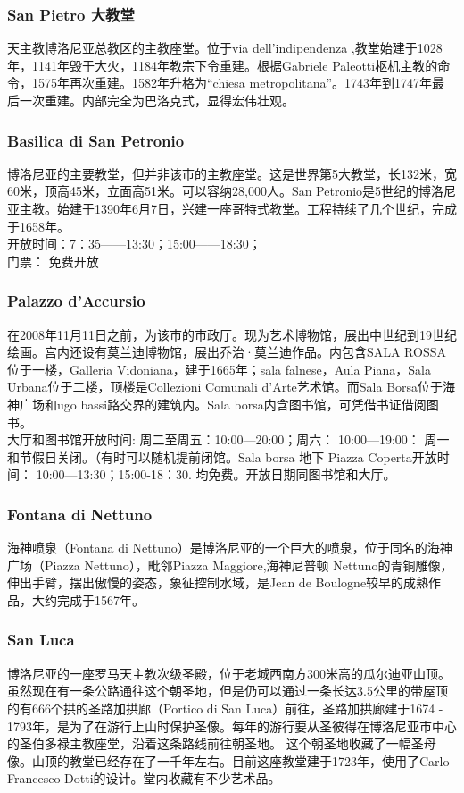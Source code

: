 \subsubsection{San Pietro 大教堂}
天主教博洛尼亚总教区的主教座堂。位于via dell'indipendenza ,教堂始建于1028年，1141年毁于大火，1184年教宗下令重建。根据Gabriele Paleotti枢机主教的命令，1575年再次重建。1582年升格为“chiesa metropolitana”。1743年到1747年最后一次重建。内部完全为巴洛克式，显得宏伟壮观。

\subsubsection{Basilica di San Petronio}
博洛尼亚的主要教堂，但并非该市的主教座堂。这是世界第5大教堂，长132米，宽60米，顶高45米，立面高51米。可以容纳28,000人。San Petronio是5世纪的博洛尼亚主教。始建于1390年6月7日，兴建一座哥特式教堂。工程持续了几个世纪，完成于1658年。\\
开放时间：7：35——13:30；15:00——18:30；\\
门票： 免费开放

\subsubsection{Palazzo d'Accursio}
在2008年11月11日之前，为该市的市政厅。现为艺术博物馆，展出中世纪到19世纪绘画。宫内还设有莫兰迪博物馆，展出乔治·莫兰迪作品。内包含SALA ROSSA位于一楼，Galleria Vidoniana，建于1665年；sala falnese，Aula Piana，Sala Urbana位于二楼，顶楼是Collezioni Comunali d'Arte艺术馆。而Sala Borsa位于海神广场和ugo bassi路交界的建筑内。Sala borsa内含图书馆，可凭借书证借阅图书。\\
大厅和图书馆开放时间: 周二至周五：10:00—20:00；周六： 10:00—19:00：   周一和节假日关闭。（有时可以随机提前闭馆。Sala borsa 地下 Piazza Coperta开放时间： 10:00—13:30；15:00-18：30. 均免费。开放日期同图书馆和大厅。

\subsubsection{Fontana di Nettuno}
海神喷泉（Fontana di Nettuno）是博洛尼亚的一个巨大的喷泉，位于同名的海神广场（Piazza Nettuno），毗邻Piazza Maggiore,海神尼普顿 Nettuno的青铜雕像，伸出手臂，摆出傲慢的姿态，象征控制水域，是Jean de Boulogne较早的成熟作品，大约完成于1567年。



\subsubsection{San Luca}
博洛尼亚的一座罗马天主教次级圣殿，位于老城西南方300米高的瓜尔迪亚山顶。
虽然现在有一条公路通往这个朝圣地，但是仍可以通过一条长达3.5公里的带屋顶的有666个拱的圣路加拱廊（Portico di San Luca）前往，圣路加拱廊建于1674 - 1793年，是为了在游行上山时保护圣像。每年的游行要从圣彼得在博洛尼亚市中心的圣伯多禄主教座堂，沿着这条路线前往朝圣地。
这个朝圣地收藏了一幅圣母像。山顶的教堂已经存在了一千年左右。目前这座教堂建于1723年，使用了Carlo Francesco Dotti的设计。堂内收藏有不少艺术品。

